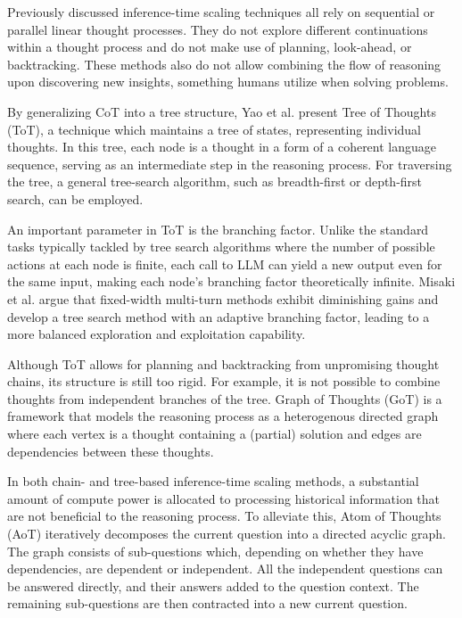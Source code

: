 Previously discussed inference-time scaling techniques all rely on sequential or parallel linear thought processes. 
They do not explore different continuations within a thought process and do not make use of 
planning, look-ahead, or backtracking\cite{yao2023treethoughtsdeliberateproblem}. These methods also do not allow 
combining the flow of reasoning upon discovering new insights, something humans utilize when solving problems\cite{Besta_2024}.

By generalizing CoT\cite{wei2023chainofthoughtpromptingelicitsreasoning}\cite{NEURIPS2022_8bb0d291} into a tree structure,
Yao et al.\cite{yao2023treethoughtsdeliberateproblem} present Tree of Thoughts (ToT), a technique which maintains a tree of states, representing individual thoughts.
In this tree, each node is a thought in a form of a coherent language sequence, serving as an intermediate step
in the reasoning process. For traversing the tree, a general tree-search algorithm, such as breadth-first or depth-first search, can be employed.

An important parameter in ToT is the branching factor. Unlike the standard tasks typically tackled by tree search algorithms 
where the number of possible actions at each node is finite, each call to LLM can yield a new output even for 
the same input, making each node's branching factor theoretically infinite\cite{misaki2025widerdeeperscalingllm}.
Misaki et al.\cite{misaki2025widerdeeperscalingllm} argue that fixed-width multi-turn methods exhibit diminishing gains 
and develop a tree search method with an adaptive branching factor, leading to a more balanced exploration and exploitation capability. 

Although ToT allows for planning and backtracking from unpromising thought chains, its structure is still too rigid\cite{Besta_2024}.
For example, it is not possible to combine thoughts from independent branches of the tree. Graph of Thoughts\cite{Besta_2024} (GoT) is 
a framework that models the reasoning process as a heterogenous directed graph where each vertex is a thought containing a (partial) solution
and edges are dependencies between these thoughts\cite{Besta_2024}. 

In both chain- and tree-based inference-time scaling methods, a substantial amount of compute power is allocated to
processing historical information that are not beneficial to the reasoning process. To alleviate this,
Atom of Thoughts\cite{teng2025atomthoughtsmarkovllm} (AoT) iteratively decomposes the current question into a directed acyclic graph.
The graph consists of sub-questions which, depending on whether they have dependencies, are dependent or independent.
All the independent questions can be answered directly, and their answers added to the question context. 
The remaining sub-questions are then contracted into a new current question. 

